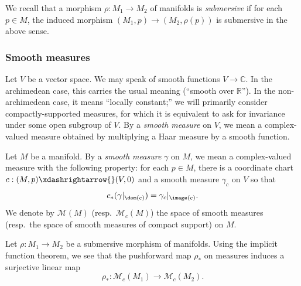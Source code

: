 We recall that a morphism $\rho : M_1 \rightarrow M_2$ of manifolds is \emph{submersive} if for each $p \in M$, the induced morphism $(M_1, p) \rightarrow (M_2, \rho(p))$ is submersive in the above sense.

\subsubsection{Smooth measures}
Let $V$ be a vector space.  We may speak of smooth functions $V \rightarrow \mathbb{C}$.  In the archimedean case, this carries the usual meaning (``smooth over $\mathbb{R}$'').  In the non-archimedean case, it means ``locally constant;'' we will primarily consider compactly-supported measures, for which it is equivalent to ask for invariance under some open subgroup of $V$.  By a \emph{smooth measure} on $V$, we mean a complex-valued measure obtained by multiplying a Haar measure by a smooth function.

Let $M$ be a manifold.  By a \emph{smooth measure} $\gamma$ on $M$, we mean a complex-valued measure with the following property: for each $p \in M$, there is a coordinate chart $c : (M,p) \xdashrightarrow{} (V, 0)$ and a smooth measure $\gamma_c$ on $V$ so that
\begin{equation*}
  c_*(\gamma|_{\dom(c)}) = \gamma_c |_{\image(c)}.
\end{equation*}
We denote by $\mathcal{M}(M)$ (resp.\ $\mathcal{M}_c(M)$) the space of smooth measures (resp.\ the space of smooth measures of compact support) on $M$.

Let $\rho : M_1 \rightarrow M_2$ be a submersive morphism of manifolds.  Using the implicit function theorem, we see that the pushforward map $\rho_*$ on measures induces a surjective linear map
\begin{equation*}
  \rho_* : \mathcal{M}_c(M_1) \rightarrow \mathcal{M}_c(M_2).
\end{equation*}

